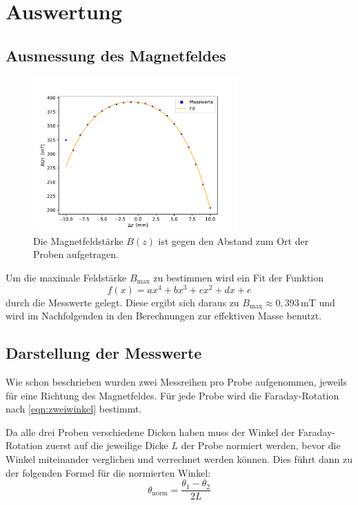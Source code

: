 \newpage
\section{Auswertung}
    \subsection{Ausmessung des Magnetfeldes}
        \begin{figure}[h]
            \centering
            \includegraphics[width = 0.7\textwidth]{plots/Magnetfeld.pdf}
            \caption{Die Magnetfeldstärke $B(z)$ ist gegen den Abstand zum Ort der Proben aufgetragen.}
            \label{fig:Magnetfeld}
        \end{figure}

        \FloatBarrier
    
        Um die maximale Feldstärke $B_{\text{max}}$ zu bestimmen wird ein Fit der Funktion
        \begin{equation*}
            f(x) = ax^4 + bx^3 + cx^2 + dx + e
        \end{equation*}
        durch die Messwerte gelegt. Diese ergibt sich daraus zu $B_{\text{max}} \approx 0,393 \,$mT und wird im Nachfolgenden in den Berechnungen zur effektiven Masse benutzt.

    \subsection{Darstellung der Messwerte}
        Wie schon beschrieben wurden zwei Messreihen pro Probe aufgenommen, jeweils für eine Richtung des Magnetfeldes. Für jede Probe wird die Faraday-Rotation nach \autoref{eqn:zweiwinkel} bestimmt.
        
        Da alle drei Proben verschiedene Dicken haben muss der Winkel der Faraday-Rotation zuerst auf die jeweilige Dicke $L$ der Probe normiert werden, bevor die Winkel miteinander verglichen und verrechnet werden können. Dies führt dann zu der folgenden Formel für die normierten Winkel:
        \begin{equation*}
            \theta_{\text{norm}} = \frac{\theta_1 - \theta_2}{2 L}
        \end{equation*}
        
